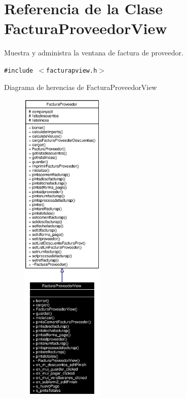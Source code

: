 \section{Referencia de la Clase Factura\-Proveedor\-View}
\label{classFacturaProveedorView}
Muestra y administra la ventana de factura de proveedor.  


{\tt \#include $<$facturapview.h$>$}

Diagrama de herencias de Factura\-Proveedor\-View\begin{figure}[H]
\begin{center}
\leavevmode
\includegraphics[width=112pt]{classFacturaProveedorView__inherit__graph}
\end{center}
\end{figure}
